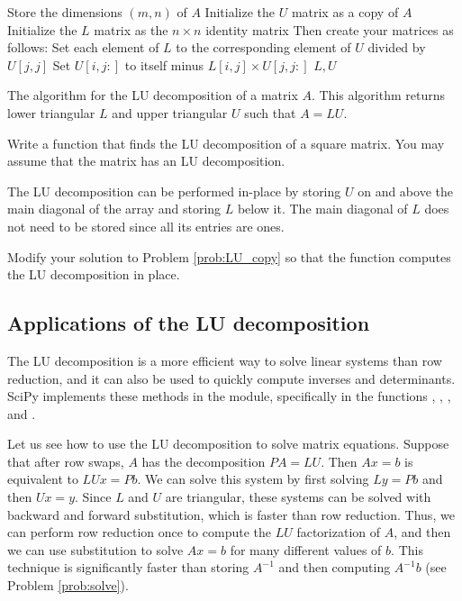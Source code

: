 \begin{algorithm}
\begin{algorithmic}[1]
\State Store the dimensions $(m, n)$ of $A$ 
\State Initialize the $U$ matrix as a copy of $A$
\State Initialize the $L$ matrix as the $n\times n$ identity matrix
\State Then create your matrices as follows:
    \State Set each element of $L$ to the corresponding element of $U$ divided by $U[j,j]$
    \State Set $U[i,j:]$ to itself minus $L[i,j] \times U[j,j:]$
    \EndFor
\EndFor
\State {} $L, U$
\EndProcedure
\end{algorithmic}
\caption{The algorithm for the LU decomposition of a matrix $A$. This algorithm returns lower triangular $L$ and upper triangular $U$ such that $A = LU$.}
\label{Alg:gram_schmidt}
\end{algorithm}

\begin{problem}
\label{prob:LU_copy}
Write a function that finds the LU decomposition of a square matrix. 
You may assume that the matrix has an LU decomposition.
\end{problem}

The LU decomposition can be performed in-place by storing $U$ on and above the main diagonal of the array and storing $L$ below it.
The main diagonal of $L$ does not need to be stored since all its entries are ones.

\begin{problem}
Modify your solution to Problem \ref{prob:LU_copy} so that the function computes the LU decomposition in place.
\end{problem}

\subsection*{Applications of the LU decomposition} %

The LU decomposition is a more efficient way to solve linear systems than row reduction, and it can also be used to quickly compute inverses and determinants. 
SciPy implements these methods in the  module, specifically in the functions , , , and .

Let us see how to use the LU decomposition to solve matrix equations. 
Suppose that after row swaps, $A$ has the decomposition $PA = LU$. 
Then $Ax=b$ is equivalent to $LUx=Pb$. 
We can solve this system by first solving $Ly = Pb$ and then $Ux = y$. 
Since $L$ and $U$ are triangular, these systems can be solved with backward and forward substitution, which is faster than row reduction. 
Thus, we can perform row reduction once to compute the $LU$ factorization of $A$, and then we can use substitution to solve $Ax=b$ for many different values of $b$. 
This technique is significantly faster than storing $A^{-1}$ and then computing $A^{-1}b$ (see Problem \ref{prob:solve}).

